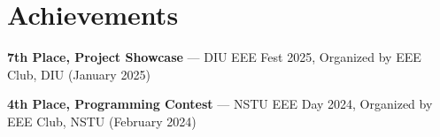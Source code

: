\section{Achievements}

\begin{onecolentry}
    \begin{highlights}

        \item \textbf{7th Place, Project Showcase} --- DIU EEE Fest 2025,
        Organized by EEE Club, DIU (January 2025)

        \item \textbf{4th Place, Programming Contest} --- NSTU EEE Day 2024,
        Organized by EEE Club, NSTU (February 2024)

    \end{highlights}
\end{onecolentry}